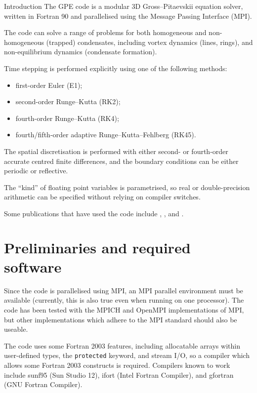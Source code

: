 %
%
\begin{chapter}{\label{cha:introduction}Introduction}
  The GPE code is a modular 3D Gross--Pitaevskii equation solver, written in
  Fortran 90 and parallelised using the Message Passing Interface (MPI).
  
  The code can solve a range of problems for both homogeneous and
  non-homogeneous (trapped) condensates, including vortex dynamics (lines,
  rings), and non-equilibrium dynamics (condensate formation).

  Time stepping is performed explicitly using one of the following methods:
  \begin{itemize}
    \item first-order Euler (E1);
    \item second-order Runge--Kutta (RK2);
    \item fourth-order Runge--Kutta (RK4);
    \item fourth/fifth-order adaptive Runge--Kutta--Fehlberg (RK45).
  \end{itemize}
  The spatial discretisation is performed with either second- or fourth-order
  accurate centred finite differences, and the boundary conditions can be
  either periodic or reflective.

  The ``kind'' of floating point variables is parametrised, so real or
  double-precision arithmetic can be specified without relying on compiler
  switches.

  Some publications that have used the code include \citet{AYB08},
  \citet{WBPYW10}, and \citet{TYB11}.

  \section{\label{sec:prelim}Preliminaries and required software}
  Since the code is parallelised using MPI, an MPI parallel environment must be
  available (currently, this is also true even when running on one processor).
  The code has been tested with the MPICH and OpenMPI implementations of MPI,
  but other implementations which adhere to the MPI standard should also be
  useable.

  The code uses some Fortran 2003 features, including allocatable arrays within
  user-defined types, the \verb"protected" keyword, and stream I/O, so a
  compiler which allows some Fortran 2003 constructs is required.  Compilers
  known to work include sunf95 (Sun Studio 12), ifort (Intel Fortran Compiler),
  and gfortran (GNU Fortran Compiler).


\end{chapter}
